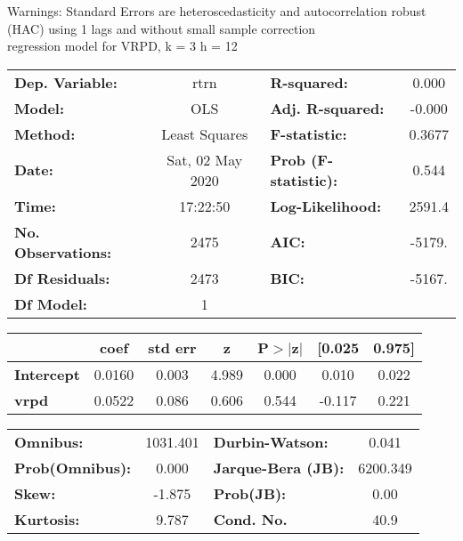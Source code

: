 Warnings: \newline
 [1] Standard Errors are heteroscedasticity and autocorrelation robust (HAC) using 1 lags and without small sample correction\\ 

regression model for VRPD, k = 3 h = 12\begin{center}
\begin{tabular}{lclc}
\toprule
\textbf{Dep. Variable:}    &       rtrn       & \textbf{  R-squared:         } &     0.000   \\
\textbf{Model:}            &       OLS        & \textbf{  Adj. R-squared:    } &    -0.000   \\
\textbf{Method:}           &  Least Squares   & \textbf{  F-statistic:       } &    0.3677   \\
\textbf{Date:}             & Sat, 02 May 2020 & \textbf{  Prob (F-statistic):} &    0.544    \\
\textbf{Time:}             &     17:22:50     & \textbf{  Log-Likelihood:    } &    2591.4   \\
\textbf{No. Observations:} &        2475      & \textbf{  AIC:               } &    -5179.   \\
\textbf{Df Residuals:}     &        2473      & \textbf{  BIC:               } &    -5167.   \\
\textbf{Df Model:}         &           1      & \textbf{                     } &             \\
\bottomrule
\end{tabular}
\begin{tabular}{lcccccc}
                   & \textbf{coef} & \textbf{std err} & \textbf{z} & \textbf{P$> |$z$|$} & \textbf{[0.025} & \textbf{0.975]}  \\
\midrule
\textbf{Intercept} &       0.0160  &        0.003     &     4.989  &         0.000        &        0.010    &        0.022     \\
\textbf{vrpd}      &       0.0522  &        0.086     &     0.606  &         0.544        &       -0.117    &        0.221     \\
\bottomrule
\end{tabular}
\begin{tabular}{lclc}
\textbf{Omnibus:}       & 1031.401 & \textbf{  Durbin-Watson:     } &    0.041  \\
\textbf{Prob(Omnibus):} &   0.000  & \textbf{  Jarque-Bera (JB):  } & 6200.349  \\
\textbf{Skew:}          &  -1.875  & \textbf{  Prob(JB):          } &     0.00  \\
\textbf{Kurtosis:}      &   9.787  & \textbf{  Cond. No.          } &     40.9  \\
\bottomrule
\end{tabular}
\end{center}

